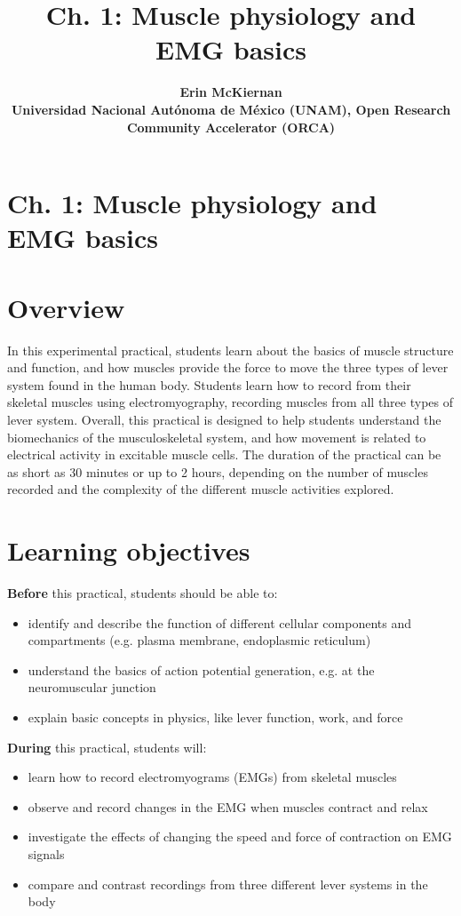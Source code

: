\documentclass{article}
\title{Ch. 1: Muscle physiology and EMG  basics }
\date{\displaydate{articleDate}}
\author{\bfseries Erin McKiernan\mdseries\\Universidad Nacional Autónoma de México (UNAM), Open Research Community Accelerator (ORCA)\\}
\begin{document}
\maketitle
\keywords{}

\section{Ch. 1: Muscle physiology and EMG  basics}

\section{Overview}

In this experimental practical, students learn about the basics of muscle structure and function, and how muscles provide the force to move the three types of lever system found in the human body. Students learn how to record from their skeletal muscles using electromyography, recording muscles from all three types of lever system. Overall, this practical is designed to help students understand the biomechanics of the musculoskeletal system, and how movement is related to electrical activity in excitable muscle cells. The duration of the practical can be as short as 30 minutes or up to 2 hours, depending on the number of muscles recorded and the complexity of the different muscle activities explored.

\section{Learning objectives}

\textbf{Before} this practical, students should be able to:

\begin{itemize}
\item identify and describe the function of different cellular components and compartments (e.g. plasma membrane, endoplasmic reticulum)
\item understand the basics of action potential generation, e.g. at the neuromuscular junction
\item explain basic concepts in physics, like lever function, work, and force
\end{itemize}

\textbf{During} this practical, students will:

\begin{itemize}
\item learn how to record electromyograms (EMGs) from skeletal muscles
\item observe and record changes in the EMG when muscles contract and relax
\item investigate the effects of changing the speed and force of contraction on EMG signals
\item compare and contrast recordings from three different lever systems in the body
\end{itemize}
\end{document}
